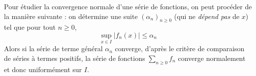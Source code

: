 \documentclass[french,11pt,twoside]{VcCours}
\newcommand{\Sum}[2]{\sum_{#1}^{#2}}
\begin{document}
\begin{Demonstration}{} 

%
%

\vspace*{13cm}
\end{Demonstration}

\medskip

\begin{Methode}{} Pour étudier la convergence normale d'une série de fonctions, on peut procéder de la manière suivante : on détermine une suite $(\alpha_n)_{n\geq 0}$ (qui ne \emph{dépend pas} de $x$) tel que pour tout $n \geq 0$,
$$ \sup_{x \in I} \vert f_n(x) \vert \leq \alpha_n$$
Alors si la série de terme général $\alpha_n$ converge, d'après le critère de comparaison de séries à termes positifs, la série de fonctions $\Sum{n \geq 0}{} f_n$ converge normalement et donc uniformément sur $I$.
\end{Methode}
\end{document}

